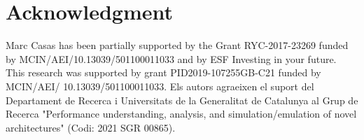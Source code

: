 \section{Acknowledgment}
\label{sec:acknowledgment}
Marc Casas has been partially supported by the Grant RYC-2017-23269 funded by MCIN/AEI/10.13039/501100011033 and by ESF Investing in your future. This research was supported by grant PID2019-107255GB-C21 funded by MCIN/AEI/ 10.13039/501100011033. Els autors agraeixen el suport del Departament de Recerca i Universitats de la Generalitat de Catalunya al Grup de Recerca "Performance understanding, analysis, and simulation/emulation of novel architectures" (Codi: 2021 SGR 00865).
